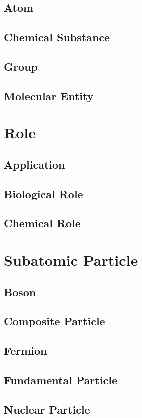 \documentclass[12pt,a4paper,openright,twoside]{book}
\begin{document}
\subsection{Atom}
\subsection{Chemical Substance}
\subsection{Group}
\subsection{Molecular Entity}

\section{Role}
\subsection{Application}
\subsection{Biological Role}
\subsection{Chemical Role}

\section{Subatomic Particle}
\subsection{Boson}
\subsection{Composite Particle}
\subsection{Fermion}
\subsection{Fundamental Particle}
\subsection{Nuclear Particle}
\end{document}
